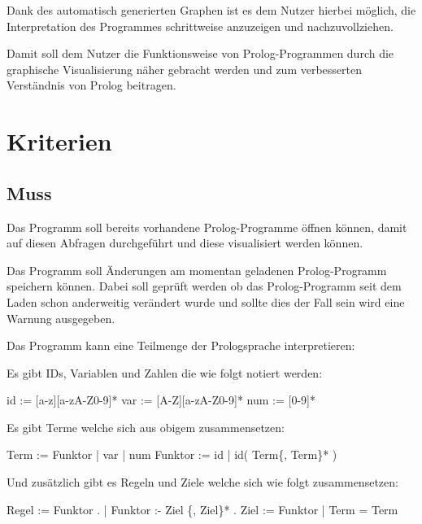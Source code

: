 \documentclass[parskip=full,11pt,twoside]{scrartcl}
\begin{document}
Dank des automatisch generierten Graphen ist es dem Nutzer hierbei möglich, die Interpretation des Programmes schrittweise anzuzeigen und nachzuvollziehen.

Damit soll dem Nutzer die Funktionsweise von Prolog-Programmen durch die graphische Visualisierung näher gebracht werden und zum verbesserten Verständnis von Prolog beitragen.

\pagebreak
\section{Kriterien}

\subsection{Muss}


Das Programm soll bereits vorhandene Prolog-Programme öffnen können, damit auf diesen Abfragen durchgeführt und diese visualisiert werden können.


Das Programm soll Änderungen am momentan geladenen Prolog-Programm speichern können. Dabei soll geprüft werden ob das Prolog-Programm seit dem Laden schon anderweitig verändert wurde und sollte dies der Fall sein wird eine Warnung ausgegeben.


Das Programm kann eine Teilmenge der Prologsprache interpretieren:

Es gibt IDs, Variablen und Zahlen die wie folgt notiert werden:

id := [a-z][a-zA-Z0-9]*\newline
var := [A-Z][a-zA-Z0-9]*\newline
num := [0-9]*

Es gibt Terme welche sich aus obigem zusammensetzen:

Term := Funktor | var | num\newline
Funktor := id | id( Term\{, Term\}* )

Und zusätzlich gibt es Regeln und Ziele welche sich wie folgt zusammensetzen:

Regel := Funktor . | Funktor :- Ziel \{, Ziel\}* .\newline
Ziel := Funktor | Term = Term
\end{document}
